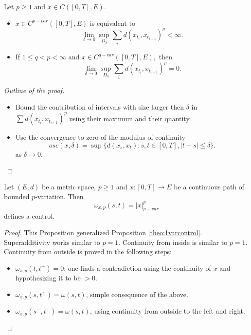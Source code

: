 \begin{proposition}
    Let $p \geq 1$ and $x \in C([0,T], E)$.
    \begin{itemize}
        \item $x \in C^{p-var}([0,T], E)$ is equivalent to
        \begin{equation}
            \lim_{\delta \rightarrow 0} \sup_{D_\delta} \sum_i d(x_{t_i}, x_{t_{i+1}})^p < \infty.
        \end{equation}
        \item If $1 \leq q < p < \infty$ and $x \in C^{q-var}([0,T], E),$ then
        \begin{equation}
            \lim_{\delta \rightarrow 0} \sup_{D_\delta} \sum_i d(x_{t_i}, x_{t_{i+1}})^p = 0.
        \end{equation}
    \end{itemize}
\end{proposition}
\begin{proof}[Outline of the proof]
    \begin{itemize}
        \item Bound the contribution of intervals with size larger then $\delta$ in $\sum d(x_{t_i}, x_{t_{i+1}})^p$ using their maximum and their quantity.
        \item Use the convergence to zero of the modulus of continuity 
        \begin{equation}
            osc(x, \delta) = \sup \{ d(x_s, x_t): s,t \in [0,T], |t - s| \leq \delta \}.
        \end{equation}
        as $\delta \rightarrow 0.$
    \end{itemize}
\end{proof}

\begin{proposition}\label{prop:pVarIsControl}
    Let $(E,d)$ be a metric space, $p \geq 1$ and $x: [0,T] \rightarrow E$ be a continuous path of bounded $p$-variation. Then
    \begin{equation}
        \omega_{x,p}(s,t) = |x|_{p-var}^p
    \end{equation}
    defines a control.
\end{proposition}
\begin{proof}
    This Proposition generalized Proposition \ref{theo:1varcontrol}.
    Superadditivity works similar to $p=1$.
    Continuity from inside is similar to $p=1$.
    Continuity from outside is proved in the following steps:
    \begin{itemize}
        \item $\omega_{x,p}(t, t^+) = 0$:
        one finds a contradiction using the continuity of $x$ and hypothesizing it to be $>0.$
        \item $\omega_{x,p}(s, t^+) = \omega(s, t)$,
        simple consequence of the above.
        \item $\omega_{x,p}(s^-, t^+) = \omega(s,t)$, using continuity from outside to the left and right.
    \end{itemize}
\end{proof}

